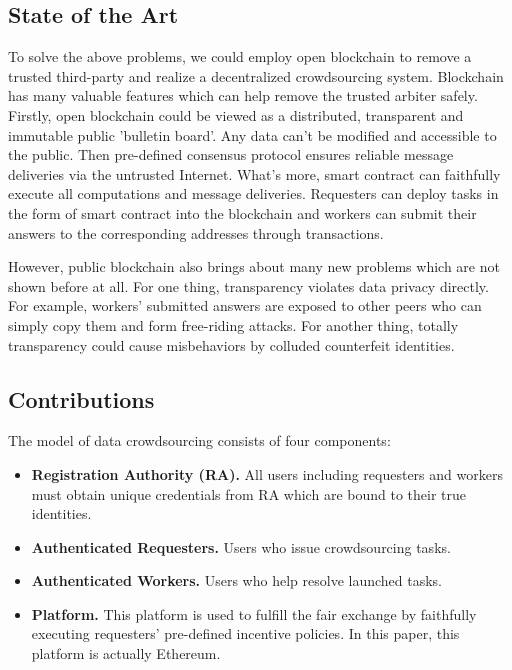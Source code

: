 \documentclass[conference]{IEEEtran}
\begin{document}
\subsection{State of the Art}
To solve the above problems, we could employ open blockchain to remove a trusted third-party and realize a decentralized crowdsourcing system.
%
Blockchain has many valuable features which can help remove the trusted arbiter safely. 
%
Firstly, open blockchain could be viewed as a distributed, transparent and immutable public 'bulletin board'.
%
Any data can't be modified and accessible to the public.
%
Then pre-defined consensus protocol ensures reliable message deliveries via the untrusted Internet. 
%
What's more, smart contract can faithfully execute all computations and message deliveries.
%
Requesters can deploy tasks in the form of smart contract into the blockchain and workers can submit their answers to the corresponding addresses through transactions.

However, public blockchain also brings about many new problems which are not shown before at all.
%
For one thing, transparency violates data privacy directly.
%
For example, workers' submitted answers are exposed to other peers who can simply copy them and form free-riding attacks.
%
For another thing, totally transparency could cause misbehaviors by colluded counterfeit identities.


\subsection{Contributions}
The model of data crowdsourcing consists of four components:
\begin{itemize}
    \item \textbf{Registration Authority (RA).} All users including requesters and workers must obtain unique credentials from RA which are bound to their true identities.
    \item \textbf{Authenticated Requesters.} Users who issue crowdsourcing tasks.
    \item \textbf{Authenticated Workers.} Users who help resolve launched tasks.
    \item \textbf{Platform.} This platform is used to fulfill the fair exchange by faithfully executing requesters' pre-defined incentive policies. In this paper, this platform is actually Ethereum. 
\end{itemize} 
\end{document}
